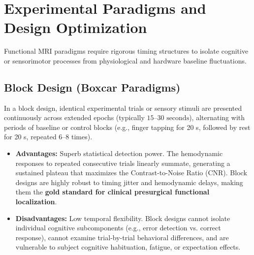 \documentclass[11pt,a4paper]{article}
\begin{document}
\section{Experimental Paradigms and Design Optimization}
Functional MRI paradigms require rigorous timing structures to isolate cognitive or sensorimotor processes from physiological and hardware baseline fluctuations.

\subsection{Block Design (Boxcar Paradigms)}
In a block design, identical experimental trials or sensory stimuli are presented continuously across extended epochs (typically $15\text{--}30\text{ seconds}$), alternating with periods of baseline or control blocks (e.g., finger tapping for 20 s, followed by rest for 20 s, repeated 6--8 times).

\begin{itemize}[leftmargin=2em]
    \item \textbf{Advantages:} Superb statistical detection power. The hemodynamic responses to repeated consecutive trials linearly summate, generating a sustained plateau that maximizes the Contrast-to-Noise Ratio ($\text{CNR}$). Block designs are highly robust to timing jitter and hemodynamic delays, making them the \textbf{gold standard for clinical presurgical functional localization}.
    \item \textbf{Disadvantages:} Low temporal flexibility. Block designs cannot isolate individual cognitive subcomponents (e.g., error detection vs. correct response), cannot examine trial-by-trial behavioral differences, and are vulnerable to subject cognitive habituation, fatigue, or expectation effects.
\end{itemize}
\end{document}
